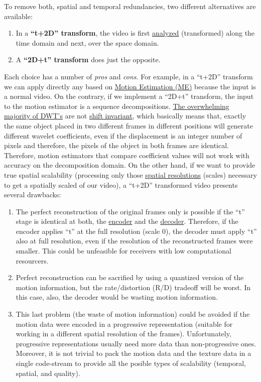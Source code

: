 To remove both, spatial and temporal redundancies, two different
alternatives are available:
\begin{enumerate}
\item In a \textbf{``t+2D'' transform}, the video is first
  \href{https://en.wikipedia.org/wiki/Digital_filter\#Analysis_techniques}{analyzed}
  (transformed) along the time domain and next, over the space domain.
\item A \textbf{``2D+t'' transform} does just the opposite.
\end{enumerate}
Each choice has a number of \emph{pros} and \emph{cons}. For example,
in a ``t+2D'' transform we can apply directly any
 based on
\href{https://en.wikipedia.org/wiki/Motion_estimation}{Motion
  Estimation (ME)} because the input is a normal video. On the
contrary, if we implement a ``2D+t'' transform, the input to the
motion estimator is a sequence decompositions.
\href{http://www.polyvalens.com/blog/wavelets/theory}{The overwhelming
  majority of DWT's} are not
\href{http://www.polyvalens.com/blog/wavelets/theory}{shift
  invariant}, which basically means that, exactly the same object
placed in two different frames in different positions will generate
different wavelet coefficients, even if the displacement is an integer
number of pixels and therefore, the pixels of the object in both
frames are identical.  Therefore, motion estimators that compare
coefficient values will not work with accuracy on the decomposition
domain. On the other hand, if we want to provide true spatial
scalability (processing only those
\href{https://www.tutorialspoint.com/dip/spatial_resolution.htm}{spatial
  resolutions} (scales) necessary to get a spatially scaled of our
video), a ``t+2D'' transformed video presents several drawbacks:

\begin{enumerate}
\item The perfect reconstruction of the original frames only is
  possible if the ``t'' stage is identical at both, the
  \href{https://en.wikipedia.org/wiki/Encoder}{encoder} and the
  \href{https://en.wikipedia.org/wiki/Decoder}{decoder}. Therefore, if
  the encoder applies ``t'' at the full resolution (scale 0), the
  decoder must apply ``t'' also at full resolution, even if the
  resolution of the reconstructed frames were smaller. This could be
  unfeasible for receivers with low computational resourcers.
\item Perfect reconstruction can be sacrified by using a quantized
  version of the motion information, but the rate/distortion (R/D)
  tradeoff will be worst. In this case, also, the decoder would be
  wasting motion information.
\item This last problem (the waste of motion information) could be
  avoided if the motion data were encoded in a progressive
  representation (suitable for working in a different spatial
  resolution of the frames). Unfortunately, progressive
  representations usually need more data than non-progressive
  ones. Moreover, it is not trivial to pack the motion data and the
  texture data in a single code-stream to provide all the posible
  types of scalability (temporal, spatial, and quality).
\end{enumerate}


